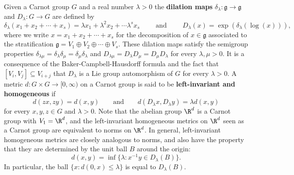 \medskip

 Given a Carnot group $G$ and a real number $\lambda>0$ the \textbf{dilation maps} $\delta_\lambda:\mathfrak{g}\to\mathfrak{g}$ and $D_\lambda:G\to G$ are defined by
\[
\delta_\lambda(x_1+x_2+\cdots+x_s)= \lambda x_1 + \lambda^2 x_2 + \cdots \lambda^s x_s \qquad \text{ and } \qquad D_\lambda(x) = \exp(\delta_\lambda(\log(x))),
\] 
where we write $x=x_1+x_2+\cdots + x_s$ for the decomposition of $x\in \mathfrak{g}$ associated to the stratification $\mathfrak{g}=V_1\oplus V_2 \oplus \cdots \oplus V_s$. These dilation maps satisfy the semigroup properties $\delta_{\lambda\mu}=\delta_\lambda \delta_\mu=\delta_\mu\delta_\lambda$ and $D_{\lambda \mu}=D_\lambda D_\mu=D_\mu D_{\lambda}$ for every $\lambda,\mu>0$.
It is a consequence of the Baker-Campbell-Hausdorff formula and the fact that $[V_i,V_j] \subseteq V_{i+j}$ that $D_\lambda$ is a Lie group automorphism of $G$ for every $\lambda>0$. A metric $d:G\times G\to [0,\infty)$ on a Carnot group is said to be \textbf{left-invariant and homogeneous} if
\[
d(zx,zy) = d(x,y) \qquad \text{and} \qquad d(D_\lambda x,D_\lambda y) = \lambda d(x,y) 
\]
for every $x,y,z\in G$ and $\lambda>0$. Note that the abelian group $\R^d$ is a Carnot group with $V_1=\R^d$, and the left-invariant homogeneous metrics on $\R^d$ seen as a Carnot group are equivalent to norms on $\R^d$. In general, left-invariant homogeneous metrics are closely analogous to norms, and also have the property that they are determined by the unit ball $B$ around the origin: 
\[
d(x,y)= \inf\{\lambda: x^{-1}y \in D_\lambda(B)\}.
\]
In particular, the ball $\{x:d(0,x)\leq \lambda\}$ is equal to $D_\lambda(B)$. 

\medskip

